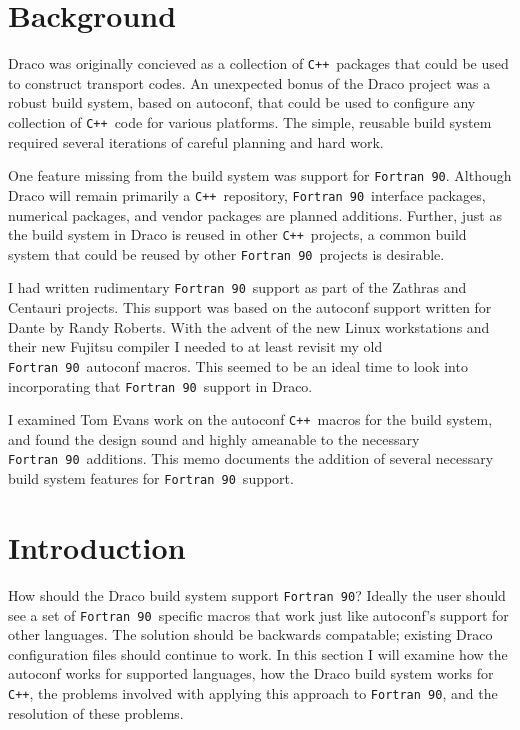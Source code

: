 \documentclass[11pt]{nmemo}
\newcommand{\fninety}{\texttt{Fortran~90}}
\newcommand{\cpp}{\texttt{C++}}
\begin{document}
\section{Background}

Draco was originally concieved as a collection of \cpp\ packages that
could be used to construct transport codes.  An unexpected bonus of
the Draco project was a robust build system, based on autoconf, that
could be used to configure any collection of \cpp\ code for various
platforms.  The simple, reusable build system required several
iterations of careful planning and hard work.

One feature missing from the build system was support for \fninety.
Although Draco will remain primarily a \cpp\ repository, \fninety\
interface packages, numerical packages, and vendor packages are
planned additions.  Further, just as the build system in Draco is
reused in other \cpp\ projects, a common build system that could be
reused by other \fninety\ projects is desirable.

I had written rudimentary \fninety\ support as part of the Zathras and
Centauri projects.  This support was based on the autoconf support
written for Dante by Randy Roberts.  With the advent of the new Linux
workstations and their new Fujitsu compiler I needed to at least
revisit my old \fninety\ autoconf macros.  This seemed to be an ideal
time to look into incorporating that \fninety\ support in Draco.

I examined Tom Evans work on the autoconf \cpp\ macros for the build
system, and found the design sound and highly ameanable to the
necessary \fninety\ additions.  This memo documents the addition of
several necessary build system features for \fninety\ support.

\newpage

\section{Introduction}

How should the Draco build system support \fninety?  Ideally the user
should see a set of \fninety\ specific macros that work just like
autoconf's support for other languages.  The solution should be
backwards compatable; existing Draco configuration files
should continue to work.  In this section I will examine how the
autoconf works for supported languages, how the Draco build system
works for \cpp, the problems involved with applying this approach to
\fninety, and the resolution of these problems.
\end{document}
